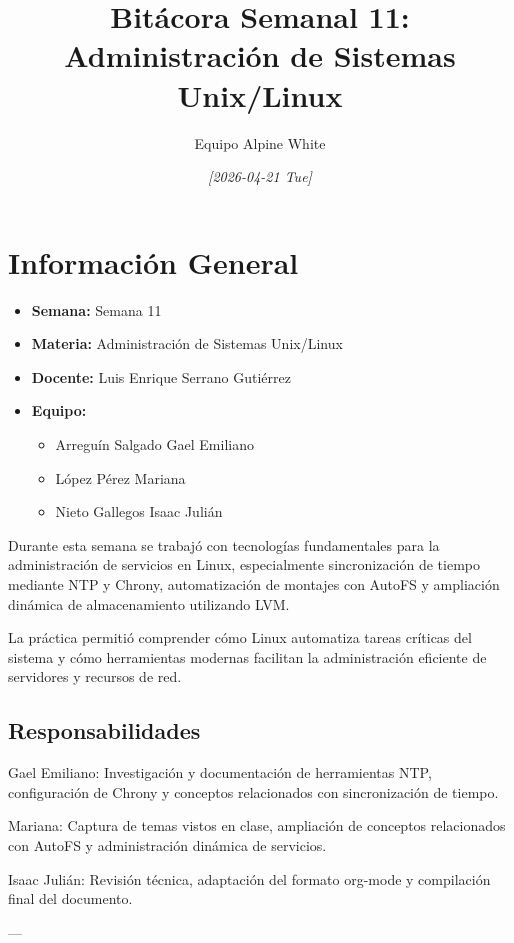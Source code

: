 \documentclass[11pt, letterpaper]{article}
\author{Equipo Alpine White}
\date{\textit{{[}2026-04-21 Tue]}}
\title{Bitácora Semanal 11: Administración de Sistemas Unix/Linux}
\begin{document}
\maketitle
\setcounter{tocdepth}{2}
\tableofcontents

\section{Información General}
\label{sec:org787b849}

\begin{itemize}
\item \textbf{Semana:} Semana 11
\item \textbf{Materia:} Administración de Sistemas Unix/Linux
\item \textbf{Docente:} Luis Enrique Serrano Gutiérrez
\item \textbf{Equipo:}

\begin{itemize}
\item Arreguín Salgado Gael Emiliano
\item López Pérez Mariana
\item Nieto Gallegos Isaac Julián
\end{itemize}
\end{itemize}

Durante esta semana se trabajó con tecnologías fundamentales para la administración de servicios en Linux, especialmente sincronización de tiempo mediante NTP y Chrony, automatización de montajes con AutoFS y ampliación dinámica de almacenamiento utilizando LVM.

La práctica permitió comprender cómo Linux automatiza tareas críticas del sistema y cómo herramientas modernas facilitan la administración eficiente de servidores y recursos de red.
\subsection{Responsabilidades}
\label{sec:org5a08167}

Gael Emiliano:
Investigación y documentación de herramientas NTP, configuración de Chrony y conceptos relacionados con sincronización de tiempo.

Mariana:
Captura de temas vistos en clase, ampliación de conceptos relacionados con AutoFS y administración dinámica de servicios.

Isaac Julián:
Revisión técnica, adaptación del formato org-mode y compilación final del documento.

---
\end{document}
